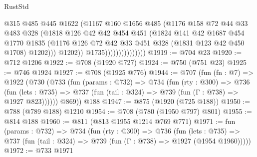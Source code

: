 \begin{lexlean}{RustStd}
\begin{coremodule}
                                  @315
                                  @485
                                  @445
                                  @1622
                                  (@1167
                                    @160
                                    @1656
                                    @485
                                    (@1176
                                      @158
                                      @72
                                      @44
                                      @33
                                      @483
                                      @328
                                      (@1818
                                        @126
                                        @42
                                        @42
                                        @454
                                        @451
                                        (@1824
                                          @141
                                          @42
                                          @1687
                                          @454
                                          @1770
                                          @1835
                                          (@1176
                                            @126
                                            @72
                                            @42
                                            @33
                                            @451
                                            @328
                                            (@1831 @123 @42 @450 @1708)
                                            @1202)))
                                      @1202))
                                  @1735)))))))))))))))
@1919 := @704 @23
@1920 := @712 @1206
@1922 := @708 (@1920 @727)
@1924 := @750 (@751 @23)
@1925 := @746 @1924
@1927 := @708 (@1925 @776)
@1944 := @707
    (fun (fn : @7) =>
    @1922
      (@730
        (@733
          (fun (params : @732) =>
          @734
            (fun (rty : @300) =>
            @736
              (fun (lets : @735) =>
              @737 (fun (tail : @324) => @739 (fun (Γ : @738) => @1927 @823))))))
        @869))
    @188
@1947 := @875 (@1920 (@725 @188))
@1950 := @788 (@789 @188) @1210
@1954 := @708 (@780 (@1950 @797) @801)
@1955 := @814 @188
@1960 := @811 (@813 @1955 @1214 @769 @771)
@1971 := fun (params : @732) =>
  @734
    (fun (rty : @300) =>
    @736
      (fun (lets : @735) =>
      @737 (fun (tail : @324) => @739 (fun (Γ : @738) => @1927 (@1954 @1960)))))
@1972 := @733 @1971

\end{coremodule}
\end{lexlean}
